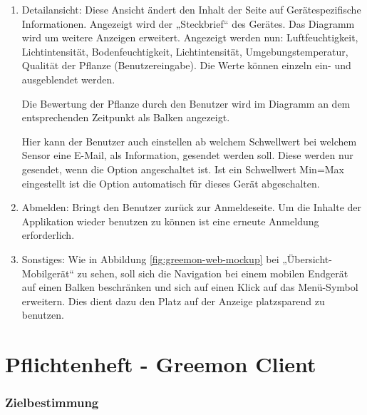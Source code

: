 \documentclass[pointlessnumbers]{scrartcl}
\begin{document}
\begin{enumerate}
\item Detailansicht: Diese Ansicht ändert den Inhalt der Seite auf Gerätespezifische Informationen. Angezeigt wird der „Steckbrief“ des Gerätes. Das Diagramm wird um weitere Anzeigen erweitert. Angezeigt werden nun: Luftfeuchtigkeit, Lichtintensität, Bodenfeuchtigkeit, Lichtintensität, Umgebungstemperatur, Qualität der Pflanze (Benutzereingabe). Die Werte können einzeln ein- und ausgeblendet werden.

Die Bewertung der Pflanze durch den Benutzer wird im Diagramm an dem entsprechenden Zeitpunkt als Balken angezeigt.

Hier kann der Benutzer auch einstellen ab welchem Schwellwert bei welchem Sensor eine E-Mail, als Information, gesendet werden soll. Diese werden nur gesendet, wenn die Option angeschaltet ist. Ist ein Schwellwert Min=Max eingestellt ist die Option automatisch für dieses Gerät abgeschalten.

\item Abmelden: Bringt den Benutzer zurück zur Anmeldeseite. Um die Inhalte der Applikation wieder benutzen zu können ist eine erneute Anmeldung erforderlich.

\item
Sonstiges: Wie in Abbildung \ref{fig:greemon-web-mockup} bei „Übersicht-Mobilgerät“ zu sehen, soll sich die Navigation bei einem mobilen Endgerät auf einen Balken beschränken und sich auf einen Klick auf das Menü-Symbol erweitern. Dies dient dazu den Platz auf der Anzeige platzsparend zu benutzen. 

\end{enumerate}





%
%
%
%

\newpage
\part{Pflichtenheft - Greemon Client}

\tableofcontents 

\newpage

\section{Zielbestimmung}
\end{document}
